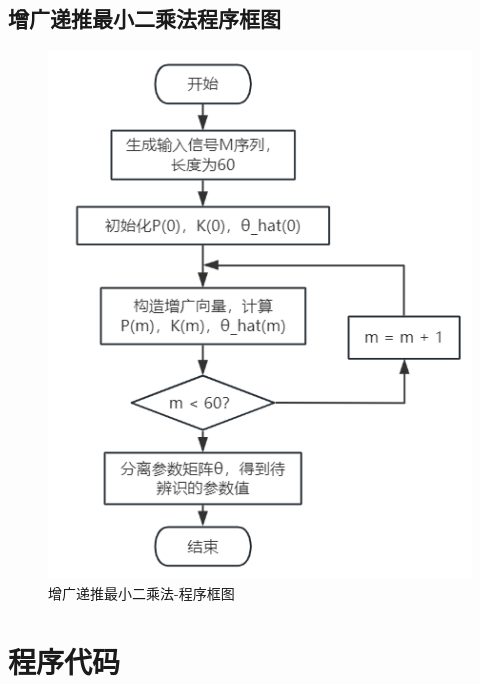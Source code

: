 \documentclass[UTF8]{article}
\begin{document}
\subsection{增广递推最小二乘法程序框图}
\begin{figure}[H]
    \centering %
    \includegraphics[width=.6\textwidth]{figure/增广递推最小二乘-程序框图.png} 
    \caption{增广递推最小二乘法-程序框图} %
\end{figure}

%
\section{程序代码}
\end{document}
